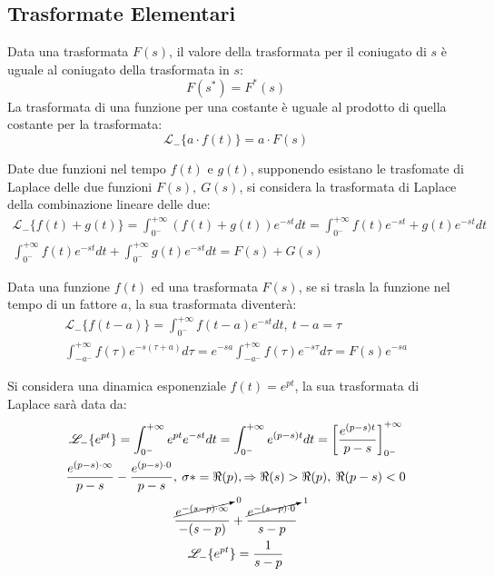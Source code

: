 \documentclass{article}
\numberwithin{equation}{subsection}
\begin{document}
\begin{center}
\end{center}

\subsection{Trasformate Elementari}

Data una trasformata $F(s)$, il valore della trasformata per il coniugato di $s$ è uguale al coniugato della trasformata in $s$:
\begin{equation}
    F(s^*)=F^*(s)
\end{equation}
La trasformata di una funzione per una costante è uguale al prodotto di quella costante per la trasformata:
\begin{equation}
    \mathscr{L}_-\{a\cdot f(t)\}=a\cdot F(s)
\end{equation} 

Date due funzioni nel tempo $f(t)$ e $g(t)$, supponendo esistano le trasfomate di Laplace delle due funzioni $F(s),\:G(s)$, si considera la trasformata di Laplace 
della combinazione lineare delle due: 
\begin{gather}
    \mathscr{L}_-\{f(t)+g(t)\}=\displaystyle\int_{0^-}^{+\infty}\left(f(t)+g(t)\right)e^{-st}dt=\int_{0^-}^{+\infty}f(t)e^{-st}+g(t)e^{-st}dt\\
    \displaystyle\int_{0^-}^{+\infty}f(t)e^{-st}dt+\int_{0^-}^{+\infty}g(t)e^{-st}dt=F(s)+G(s)
\end{gather}

Data una funzione $f(t)$ ed una trasformata $F(s)$, se si trasla la funzione nel tempo di un fattore $a$, la sua trasformata diventerà:
\begin{gather}
    \mathscr{L}_-\{f(t-a)\}=\displaystyle\int_{0^-}^{+\infty}f(t-a)e^{-st}dt,\:t-a=\tau\\
    \displaystyle\int_{-a^-}^{+\infty}f(\tau)e^{-s(\tau+a)}d\tau=e^{-sa}\int_{-a^-}^{+\infty}f(\tau)e^{-s\tau}d\tau=F(s)e^{-sa}
\end{gather}


Si considera una dinamica esponenziale $f(t)=e^{pt}$, la sua trasformata di Laplace sarà data da:
\begin{gather}
    \mathscr{L}_-\{e^{pt}\}=\displaystyle\int_{0^-}^{+\infty}e^{pt}e^{-st}dt=\int_{0^-}^{+\infty}e^{(p-s)t}dt=\left[\frac{e^{(p-s)t}}{p-s}\right]^{+\infty}_{0^-}\\
    \displaystyle\frac{e^{(p-s)\cdot\infty}}{p-s}-\frac{e^{(p-s)\cdot0}}{p-s},\:\sigma*=\Re(p),\Rightarrow \Re(s)>\Re(p),\:\Re(p-s)<0\\
    \displaystyle\frac{\cancelto{0}{e^{-(s-p)\cdot\infty}}}{-(s-p)}+\frac{\cancelto{1}{e^{-(s-p)\cdot0}}}{s-p}\\
    \mathscr{L}_-\{e^{pt}\}=\displaystyle\frac{1}{s-p}
\end{gather}
\end{document}
